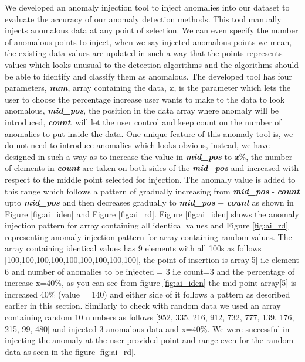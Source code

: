We developed an anomaly injection tool to inject anomalies into our dataset to evaluate the accuracy of our anomaly detection methods. This tool manually injects anomalous data at any point of selection. We can even specify the number of anomalous points to inject, when we say injected anomalous points we mean, the existing data values are updated in such a way that the points represents values which looks unusual to the detection algorithms and the algorithms should be able to identify and classify them as anomalous. The developed tool has four parameters, \textbf{\textit{num}}, array containing the data, \textbf{\textit{x}}, is the parameter which lets the user to choose the percentage increase user wants to make to the data to look anomalous, \textbf{\textit{mid\_pos}}, the position in the data array where anomaly will be introduced, \textbf{\textit{count}}, will let the user control and keep count on the number of anomalies to put inside the data. One unique feature of this anomaly tool is, we do not need to introduce anomalies which looks obvious, instead, we have designed in such a way as to increase the value in  \textbf{\textit{mid\_pos}} to  \textbf{\textit{x}}\%, the number of elements in \textbf{\textit{count}} are taken on both sides of the \textbf{\textit{mid\_pos}} and increased with respect to the middle point selected for injection. The anomaly value is added to this range which follows a pattern of gradually increasing  from \textbf{\textit{mid\_pos}} - \textbf{\textit{count}} upto \textbf{\textit{mid\_pos}}  and then decreases gradually to   \textbf{\textit{mid\_pos}} + \textbf{\textit{count}} as shown in Figure \ref{fig:ai_iden} and  Figure \ref{fig:ai_rd}. Figure \ref{fig:ai_iden} shows the anomaly injection pattern for array containing all identical values and Figure \ref{fig:ai_rd} representing anomaly injection pattern for array containing random values. The array containing identical values has 9 elements with all 100s as follows [100,100,100,100,100,100,100,100,100], the point of insertion is array[5] i.e element 6 and number of anomalies to be injected = 3 i.e count=3 and the percentage of increase x=40\%, as you can see from figure \ref{fig:ai_iden} the mid point array[5] is increased 40\% (value = 140) and either side of it follows a pattern as described earlier in this section. Similarly to check with random data we used an array containing random 10 numbers as follows [952, 335, 216, 912, 732, 777, 139, 176, 215, 99, 480] and injected 3 anomalous data and x=40\%. We were successful in injecting the anomaly at the user provided point and range even for the random data as seen in the figure \ref{fig:ai_rd}. 

